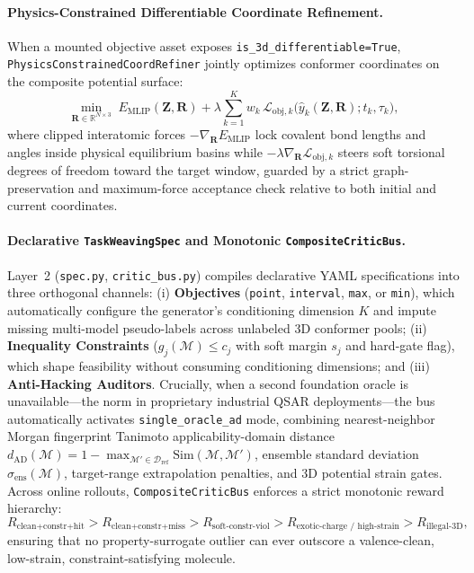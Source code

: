 \documentclass[11pt,a4paper]{article}
\begin{document}
\paragraph{Physics-Constrained Differentiable Coordinate Refinement.}
When a mounted objective asset exposes \texttt{is\_3d\_differentiable=True}, \texttt{PhysicsConstrainedCoordRefiner} jointly optimizes conformer coordinates on the composite potential surface:
\begin{equation}
\label{eq:coord_refine}
\min_{\mathbf{R} \in \mathbb{R}^{N \times 3}} \; E_{\text{MLIP}}(\mathbf{Z}, \mathbf{R}) + \lambda \sum_{k=1}^K w_k \, \mathcal{L}_{\text{obj}, k}\!\big(\hat{y}_k(\mathbf{Z}, \mathbf{R}); t_k, \tau_k\big),
\end{equation}
where clipped interatomic forces $-\nabla_{\mathbf{R}} E_{\text{MLIP}}$ lock covalent bond lengths and angles inside physical equilibrium basins while $-\lambda \nabla_{\mathbf{R}}\mathcal{L}_{\text{obj}, k}$ steers soft torsional degrees of freedom toward the target window, guarded by a strict graph-preservation and maximum-force acceptance check relative to both initial and current coordinates.

\paragraph{Declarative \texttt{TaskWeavingSpec} and Monotonic \texttt{CompositeCriticBus}.}
Layer~2 (\texttt{spec.py}, \texttt{critic\_bus.py}) compiles declarative YAML specifications into three orthogonal channels:
(i) \textbf{Objectives} (\texttt{point}, \texttt{interval}, \texttt{max}, or \texttt{min}), which automatically configure the generator's conditioning dimension $K$ and impute missing multi-model pseudo-labels across unlabeled 3D conformer pools;
(ii) \textbf{Inequality Constraints} ($g_j(\mathcal{M}) \le c_j$ with soft margin $s_j$ and hard-gate flag), which shape feasibility without consuming conditioning dimensions; and
(iii) \textbf{Anti-Hacking Auditors}. Crucially, when a second foundation oracle is unavailable---the norm in proprietary industrial QSAR deployments---the bus automatically activates \texttt{single\_oracle\_ad} mode, combining nearest-neighbor Morgan fingerprint Tanimoto applicability-domain distance $d_{\text{AD}}(\mathcal{M}) = 1 - \max_{\mathcal{M}' \in \mathcal{D}_{\text{ref}}} \text{Sim}(\mathcal{M}, \mathcal{M}')$, ensemble standard deviation $\sigma_{\text{ens}}(\mathcal{M})$, target-range extrapolation penalties, and 3D potential strain gates. Across online rollouts, \texttt{CompositeCriticBus} enforces a strict monotonic reward hierarchy:
\begin{equation}
\label{eq:hierarchy}
R_{\text{clean+constr+hit}} > R_{\text{clean+constr+miss}} > R_{\text{soft-constr-viol}} > R_{\text{exotic-charge / high-strain}} > R_{\text{illegal-3D}},
\end{equation}
ensuring that no property-surrogate outlier can ever outscore a valence-clean, low-strain, constraint-satisfying molecule.
\end{document}
